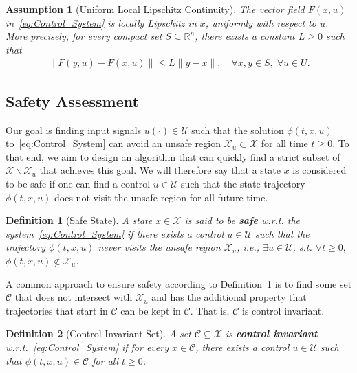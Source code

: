 \documentclass[letterpaper, 10 pt, conference]{ieeeconf}
\newtheorem{assumption}{Assumption}
\newtheorem{definition}{Definition}
\begin{document}
\begin{assumption}[Uniform Local Lipschitz Continuity]\label{ass:lipschitz}
The vector field $F(x,u)$ in~\eqref{eq:Control_System} is locally Lipschitz in $x$, uniformly with respect to $u$. More precisely, for every compact set $S \subseteq \mathbb{R}^n$, there exists a constant $L \geq 0$ such that
\begin{align*}
\| F(y,u) - F(x,u) \| \leq L \|y - x\|, 
\quad \forall x,y \in S, \; \forall u \in U.
\end{align*}
\end{assumption}

\subsection{Safety Assessment}
Our goal is finding input signals $u(\cdot) \in \mathcal{U}$ such that the solution $\phi(t,x,u)$ to~\eqref{eq:Control_System} can avoid an unsafe region $\mathcal{X}_u \subset \mathcal{X}$ for all time $t\geq 0$. To that end, we aim to design an algorithm that can quickly find a strict subset of $\mathcal{X} \backslash \mathcal{X}_u$ that achieves this goal. We will therefore say that a state $x$ is considered to be safe if one can find a control $u \in \mathcal U$ such that the state trajectory $\phi(t, x, u)$ does not visit the unsafe region for all future time.

\begin{definition}[Safe State]
\label{def:safety}
A state $x \in \mathcal{X}$ is said to be \textbf{safe} w.r.t. the system~\eqref{eq:Control_System} if there exists a control $u \in \mathcal{U}$ such that the trajectory $\phi(t, x, u)$ never visits the unsafe region $\mathcal{X}_{u}$, i.e., $ \exists u \in \mathcal{U}$, s.t. $\forall t \geq 0,$ $\phi(t, x, u) \notin \mathcal{X}_{u}$.
\end{definition}

A common approach to ensure safety according to Definition~\ref{def:safety} is to find some set $\mathcal{C}$ that does not intersect with $\mathcal{X}_u$ and has the additional property that trajectories that start in $\mathcal{C}$ can be kept in $\mathcal{C}$. That is, $\mathcal{C}$ is control invariant.

\begin{definition}[Control Invariant Set]
A set $\mathcal{C} \subseteq \mathcal{X}$ is \textbf{control invariant} w.r.t.~\eqref{eq:Control_System} if for every $x \in \mathcal{C}$, there exists a control $u \in \mathcal{U}$ such that $\phi(t,x,u) \in \mathcal{C}$ for all $t \ge 0$.
\end{definition}
\end{document}
